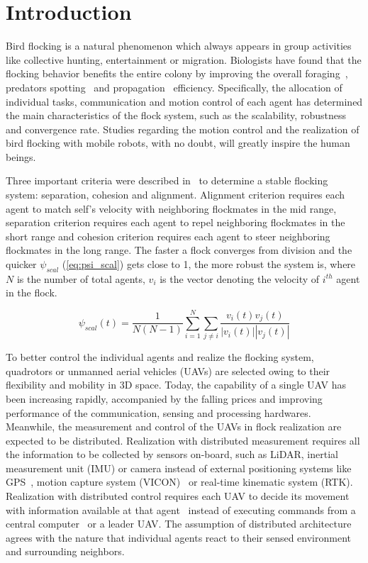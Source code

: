 \chapter{Introduction}\label{introduction}

Bird flocking is a natural phenomenon which always appears in group activities like collective hunting, entertainment or migration. Biologists have found that the flocking behavior benefits the entire colony by improving the overall foraging~\cite{Foraging}, predators spotting~\cite{Predator} and propagation~\cite{Propagation} efficiency. Specifically, the allocation of individual tasks, communication and motion control of each agent has determined the main characteristics of the flock system, such as the scalability, robustness and convergence rate. Studies regarding the motion control and the realization of bird flocking with mobile robots, with no doubt, will greatly inspire the human beings.

Three important criteria were described in~\cite{Reynolds1987} to determine a stable flocking system: separation, cohesion and alignment. Alignment criterion requires each agent to match self's velocity with neighboring flockmates in the mid range, separation criterion requires each agent to repel neighboring flockmates in the short range and cohesion criterion requires each agent to steer neighboring flockmates in the long range. The faster a flock converges from division and the quicker $\psi_{scal}$ (\ref{eq:psi_scal}) gets close to 1, the more robust the system is, where $N$ is the number of total agents, $v_i$ is the vector denoting the velocity of $i^{th}$ agent in the flock.

\begin{equation}\label{eq:psi_scal}
\psi_{scal}(t)=\frac{1}{N(N-1)}\sum^N_{i=1}\sum_{j\neq i}\frac{v_i(t)v_j(t)}{|v_i(t)||v_j(t)|}
\end{equation}

To better control the individual agents and realize the flocking system, quadrotors or unmanned aerial vehicles (UAVs) are selected owing to their flexibility and mobility in 3D space. Today, the capability of a single UAV has been increasing rapidly, accompanied by the falling prices and improving performance of the communication, sensing and processing hardwares. Meanwhile, the measurement and control of the UAVs in flock realization are expected to be distributed. Realization with distributed measurement requires all the information to be collected by sensors on-board, such as LiDAR, inertial measurement unit (IMU) or camera instead of external positioning systems like GPS~\cite{Vicsek2018}, motion capture system (VICON)~\cite{Swarm2018,MPC} or real-time kinematic system (RTK). Realization with distributed control requires each UAV to decide its movement with information available at that agent~\cite{MAV2017} instead of executing commands from a central computer~\cite{CAPT,POMDP,Kumar2018} or a leader UAV. The assumption of distributed architecture agrees with the nature that individual agents react to their sensed environment and surrounding neighbors.

